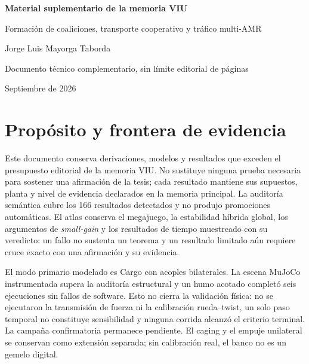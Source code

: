 \documentclass[12pt,a4paper]{article}
\begin{document}
\hypersetup{pageanchor=false}
\begin{titlepage}
  \centering
  \vspace*{2.2cm}
  {\Large\bfseries Material suplementario de la memoria VIU\par}
  \vspace{0.8cm}
  {\large Formación de coaliciones, transporte cooperativo y tráfico multi-AMR\par}
  \vfill
  {\large Jorge Luis Mayorga Taborda\par}
  \vspace{0.3cm}
  {\normalsize Documento técnico complementario, sin límite editorial de páginas\par}
  \vspace{1.4cm}
  {\normalsize Septiembre de 2026\par}
\end{titlepage}

\hypersetup{pageanchor=true}
\tableofcontents
\clearpage
{}

\section{Propósito y frontera de evidencia}

Este documento conserva derivaciones, modelos y resultados que exceden el
presupuesto editorial de la memoria VIU. No sustituye ninguna prueba
necesaria para sostener una afirmación de la tesis; cada resultado mantiene
sus supuestos, planta y nivel de evidencia declarados en la memoria
principal. La auditoría semántica cubre los 166 resultados detectados y no
produjo promociones automáticas. El atlas conserva el megajuego, la
estabilidad híbrida global, los argumentos de \emph{small-gain} y los
resultados de tiempo muestreado con su veredicto: un fallo no sustenta un
teorema y un resultado limitado aún requiere cruce exacto con una afirmación
y su evidencia.

El modo primario modelado es Cargo con acoples bilaterales. La escena MuJoCo
instrumentada supera la auditoría estructural y un humo acotado completó seis
ejecuciones sin fallos de software. Esto no cierra la validación física: no se
ejecutaron la transmisión de fuerza ni la calibración rueda--twist, un solo paso
temporal no constituye sensibilidad y ninguna corrida alcanzó el criterio
terminal. La campaña confirmatoria permanece pendiente. El caging y el empuje
unilateral se conservan como extensión separada; sin calibración real, el banco
no es un gemelo digital.
\end{document}
